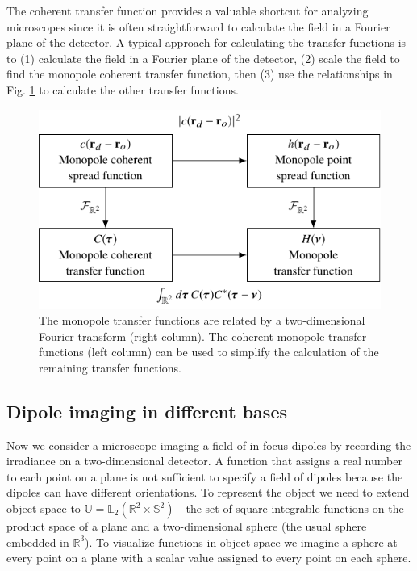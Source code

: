 \documentclass[]{osa-article}
\providecommand{\mbb}[1]{\mathbb{#1}}
\begin{document}
The coherent transfer function provides a valuable shortcut for analyzing
microscopes since it is often straightforward to calculate the field in a
Fourier plane of the detector. A typical approach for calculating the transfer
functions is to (1) calculate the field in a Fourier plane of the detector, (2)
scale the field to find the monopole coherent transfer function, then (3) use
the relationships in Fig. \ref{fig:monopole-transfer-functions} to calculate
the other transfer functions.

\begin{figure}
  \centering
  \includegraphics[scale=1.0]{../figures/monopole-transfer-functions/monopole-transfer-functions.pdf}
  \caption{The monopole transfer functions are related by a
    two-dimensional Fourier transform (right column). The coherent monopole
    transfer functions (left column) can be used to simplify the calculation of
    the remaining transfer functions.}
   \label{fig:monopole-transfer-functions}
 \end{figure}

\subsection{Dipole imaging in different bases}\label{sec:dipole}
Now we consider a microscope imaging a field of in-focus dipoles by recording
the irradiance on a two-dimensional detector. A function that assigns a real
number to each point on a plane is not sufficient to specify a field of dipoles
because the dipoles can have different orientations. To represent the object we
need to extend object space to
$\mbb{U} = \mbb{L}_2(\mbb{R}^2\times\mbb{S}^2)$---the set of square-integrable
functions on the product space of a plane and a two-dimensional sphere (the
usual sphere embedded in $\mbb{R}^3$). To visualize functions in object space we
imagine a sphere at every point on a plane with a scalar value assigned to every
point on each sphere.
\end{document}
